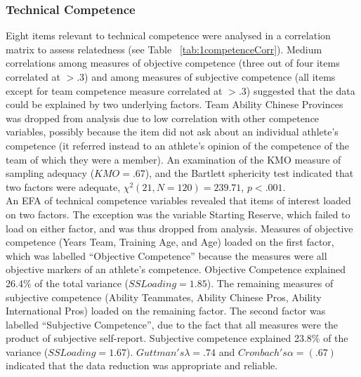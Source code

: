 {\subsubsection{Technical Competence \label{app8:technicalCompetenceEFA}}

Eight items relevant to technical competence were analysed in a correlation matrix to assess relatedness (see Table ~\ref{tab:1competenceCorr}). Medium correlations among measures of objective competence (three out of four items correlated at $> .3$) and among measures of subjective competence (all items except for team competence measure correlated at $> .3$) suggested that the data could be explained by two underlying factors. Team Ability Chinese Provinces was dropped from analysis due to low correlation with other competence variables, possibly because the item did not ask about an individual athlete’s competence (it referred instead to an athlete’s opinion of the competence of the team of which they were a member). An examination of the KMO measure of sampling adequacy ($KMO = .67$), and the Bartlett sphericity test indicated that two factors were adequate, $\chi^2(21, N = 120) = 239.71$, $p < .001$. \\

An EFA of technical competence variables revealed that items of interest loaded on two factors. The exception was the variable Starting Reserve, which failed to load on either factor, and was thus dropped from analysis. Measures of objective competence (Years Team, Training Age, and Age) loaded on the first factor, which was labelled ``Objective Competence'' because the measures were all objective markers of an athlete's competence.  Objective Competence explained 26.4\% of the total variance ($SS Loading = 1.85$). The remaining measures of subjective competence (Ability Teammates, Ability Chinese Pros, Ability International Pros) loaded on the remaining factor.  The second factor was labelled ``Subjective Competence'', due to the fact that all measures were the product of subjective self-report.  Subjective competence explained 23.8\% of the variance ($SS Loading = 1.67$). $Guttman's \lambda =.74$ and $Cronbach's \alpha = (.67)$ indicated that the data reduction was appropriate and reliable.





























}
